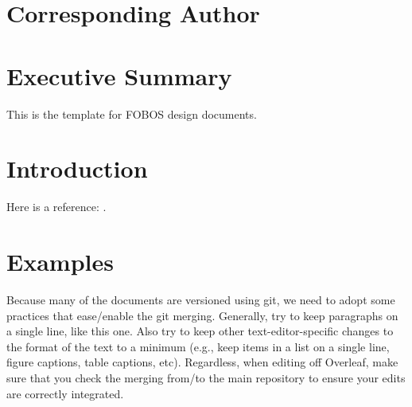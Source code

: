 \documentclass[11pt,a4paper,twoside,onecolumn,openany,final,oldfontcommands]{memoir}
\begin{document}


\frontmatter

\thispagestyle{empty}  %

\clearpage
\setupmaintoc
\tableofcontents 

\clearpage
\listoffigures

\chapter{Corresponding Author}
%



\chapter{Executive Summary}

This is the template for FOBOS design documents.



\mainmatter

\chapter{Introduction}

Here is a reference: \citet{2019BAAS...51g.198B}.

\chapter{Examples}

Because many of the documents are versioned using git, we need to adopt some practices that ease/enable the git merging.  Generally, try to keep paragraphs on a single line, like this one.  Also try to keep other text-editor-specific changes to the format of the text to a minimum (e.g., keep items in a list on a single line, figure captions, table captions, etc).  Regardless, when editing off Overleaf, make sure that you check the merging from/to the main repository to ensure your edits are correctly integrated.
\end{document}
